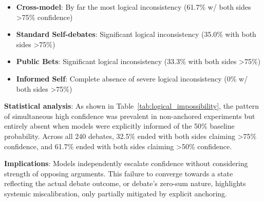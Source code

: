 \documentclass{article}
\begin{document}
\begin{itemize}
    \item \textbf{Cross-model}: By far the most logical inconsistency (61.7\% w/ both sides >75\% confidence)
    \item \textbf{Standard Self-debates}: Significant logical inconsistency (35.0\% with both sides >75\%)
    \item \textbf{Public Bets}: Significant logical inconsistency (33.3\% with both sides >75\%)
    \item \textbf{Informed Self}: Complete absence of severe logical inconsistency (0\% w/ both sides >75\%)
\end{itemize}

\textbf{Statistical analysis}: As shown in Table~\ref{tab:logical_impossibility}, the pattern of simultaneous high confidence was prevalent in non-anchored experiments but entirely absent when models were explicitly informed of the 50\% baseline probability. Across all 240 debates, 32.5\% ended with both sides claiming >75\% confidence, and 61.7\% ended with both sides claiming >50\% confidence.

\textbf{Implications}: Models independently escalate confidence without considering strength of opposing arguments. This failure to converge towards a state reflecting the actual debate outcome, or debate's zero-sum nature, highlights systemic miscalibration, only partially mitigated by explicit anchoring.
\end{document}
